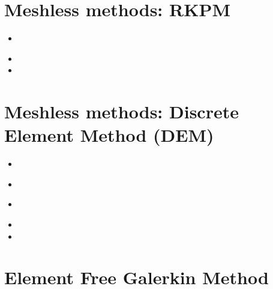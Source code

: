 \section{Meshless methods: RKPM}

\begin{scriptsize}
\begin{itemize}
\item[\twothousand]
\\
\item[\twothousandtwo]  
\item[\twothousandfour] 
\end{itemize}
\end{scriptsize}

\section{Meshless methods: Discrete Element Method (DEM)}

\begin{scriptsize}
\begin{itemize}
\item[\twothousandsix] 
\item[\twothousandthirteen]
\\
\item[\twothousandnineteen] 
\\
\item[\twothousandtwentytwo] 
\item[\twothousandtwentyfour] 
\end{itemize}
\end{scriptsize}

\section{Element Free Galerkin Method}

